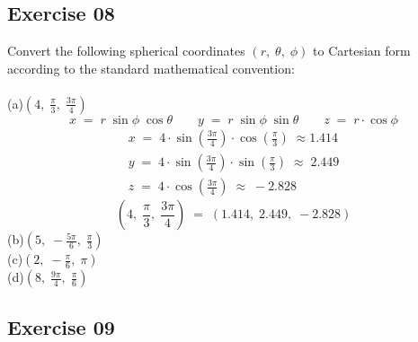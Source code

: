 \documentclass[12pt, a4paper]{article}
\begin{document}
\newpage\quad
\subsection*{Exercise 08}
Convert the following spherical coordinates
$(r,\;\theta,\;\phi)$ to Cartesian form according to the standard mathematical convention:\\\\
	(a)\quad$\left(4,\;\frac{\pi}{3},\;\frac{3\pi}{4}\right)$
		\begin{equation}
			\tag*{}
				x\;=\;r\;\sin\phi\;\cos\theta\qquad
				y\;=\;r\;\sin\phi\;\sin\theta\qquad
				z\;=\;r\cdot\cos\phi
		\end{equation}
		\begin{gather}
			\tag*{}
				x\;=\;4\cdot\sin\left(\frac{3\pi}{4}\right)\cdot
					\cos\left(\frac{\pi}{3}\right)
					\;\approx1.414\\
			\tag*{}
				y\;=\;4\cdot\sin\left(\frac{3\pi}{4}\right)\cdot
					\sin\left(\frac{\pi}{3}\right)
					\;\approx\;2.449\\
			\tag*{}
				z\;=\;4\cdot\cos\left(\frac{3\pi}{4}\right)
				\;\approx\;-2.828
		\end{gather}
		\begin{equation}
			\tag*{}
				\left(4,\;\frac{\pi}{3},\;\frac{3\pi}{4}\right)
				\;=\;(1.414,\;2.449,\;-2.828)
		\end{equation}
	(b)\quad$\left(5,\;-\frac{5\pi}{6},\;\frac{\pi}{3}\right)$\\
	(c)\quad$\left(2,\;-\frac{\pi}{6},\;\pi\right)$\\
	(d)\quad$\left(8,\;\frac{9\pi}{4},\;\frac{\pi}{6}\right)$
	
\subsection*{Exercise 09}
\end{document}
